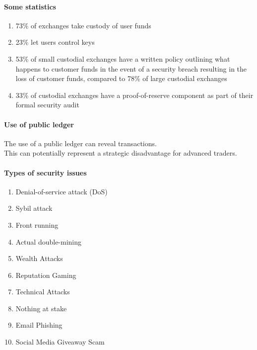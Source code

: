 \documentclass[]{article}
\begin{document}
	\paragraph{Some statistics}
	\begin{enumerate}
	\item 73\% of exchanges take custody of user funds
	\item  23\% let users control keys
	\item 53\% of small custodial exchanges have a written 
	policy outlining what happens to customer funds in the 
	event of a security breach resulting in the loss of customer 
	funds, compared to 78\% of large custodial exchanges
	\item 33\% of custodial exchanges have a proof-of-reserve 
	component as part of their formal security audit
	\end{enumerate}
	\paragraph{Use of public ledger}
	The use of a public ledger can reveal transactions.\\
	This can potentially represent a strategic disadvantage
	for advanced traders.\\	
	\paragraph{Types of security issues}
	\begin{enumerate}
	 \item Denial-of-service attack (DoS)
	 \item Sybil attack
	 \item Front running
	 \item Actual double-mining 
	\item Wealth Attacks
    \item Reputation Gaming
	\item Technical Attacks
	\item Nothing at stake 
    \item Email Phishing
	\item Social Media Giveaway Scam
	\end{enumerate}
\end{document}
